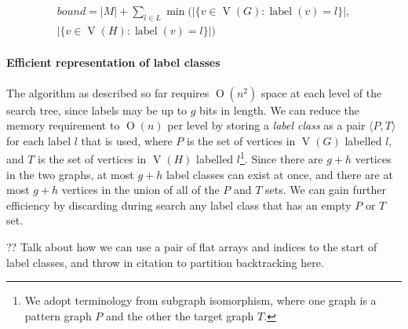 \documentclass[letterpaper]{article}
\DeclareMathOperator{\V}{V}
\DeclareMathOperator{\vtxlabel}{label}
\newcommand{\BigO}[1]{\ensuremath{\operatorname{O}\left(#1\right)}}
\begin{document}
\begin{multline*}
    \mathit{bound} = |M| + \sum_{l \in L} \min\big(|\{ v \in \V(G) : \vtxlabel(v)=l\}|, \\[-0.2cm]
        |\{ v \in \V(H) : \vtxlabel(v)=l \}|\big)
\end{multline*}



\paragraph{Efficient representation of label classes} The algorithm as
described so far requires $\BigO{n^2}$ space at each level of the search tree,
since labels may be up to $g$ bits in length. We can reduce the memory
requirement to $\BigO{n}$ per level by storing a \emph{label class} as a pair
$\langle P,T \rangle$ for each label $l$ that is used, where $P$ is the set of
vertices in $\V(G)$ labelled $l$, and $T$ is the set of vertices in $\V(H)$
labelled $l$\footnote{We adopt terminology from subgraph isomorphism, where one
graph is a pattern graph $P$ and the other the target graph $T$.}. Since there
are $g + h$ vertices in the two graphs, at most $g + h$ label classes
can exist at once, and there are at most $g + h$ vertices in the union of
all of the $P$ and $T$ sets.  We can gain further efficiency by discarding
during search any label class that has an empty $P$ or $T$ set.

?? Talk about how we can use a pair of flat arrays and indices to the start of
label classes, and throw in citation to partition backtracking here.
\end{document}
